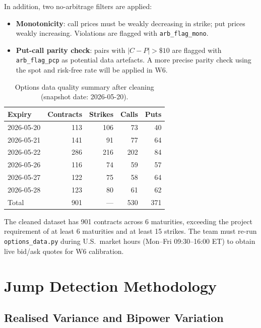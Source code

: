 \documentclass[11pt,a4paper]{article}
\begin{document}
In addition, two no-arbitrage filters are applied:
\begin{itemize}
  \item \textbf{Monotonicity}: call prices must be weakly decreasing in strike; put prices weakly increasing. Violations are flagged with \texttt{arb\_flag\_mono}.
  \item \textbf{Put-call parity check}: pairs with $|C-P|>\$10$ are flagged with \texttt{arb\_flag\_pcp} as potential data artefacts. A more precise parity check using the spot and risk-free rate will be applied in W6.
\end{itemize}

\begin{table}[H]
\centering
\caption{Options data quality summary after cleaning (snapshot date: 2026-05-20).}
\label{tab:options-quality}
\begin{tabular}{lrrrr}
\toprule
Expiry & Contracts & Strikes & Calls & Puts \\
\midrule
2026-05-20 & 113 & 106 &  73 &  40 \\
2026-05-21 & 141 &  91 &  77 &  64 \\
2026-05-22 & 286 & 216 & 202 &  84 \\
2026-05-26 & 116 &  74 &  59 &  57 \\
2026-05-27 & 122 &  75 &  58 &  64 \\
2026-05-28 & 123 &  80 &  61 &  62 \\
\midrule
Total & 901 & --- & 530 & 371 \\
\bottomrule
\end{tabular}
\end{table}

The cleaned dataset has 901 contracts across 6 maturities, exceeding the project requirement of at least 6 maturities and at least 15 strikes. The team must re-run \texttt{options\_data.py} during U.S.\ market hours (Mon--Fri 09:30--16:00 ET) to obtain live bid/ask quotes for W6 calibration.

\section{Jump Detection Methodology}
\label{sec:diagnostic}

\subsection{Realised Variance and Bipower Variation}
\end{document}
